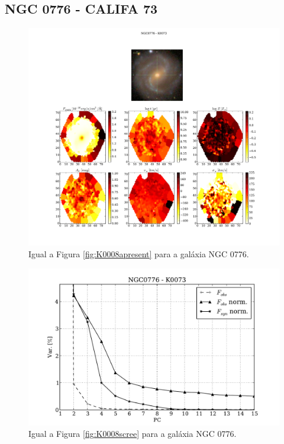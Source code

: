 \subsection{NGC 0776 - CALIFA 73}

\begin{figure}
    \includegraphics[width=1.\textwidth]{figuras/K0073-apresent.pdf}
    \caption[Propriedades f\'isicas da gal\'axia NGC 0776.]
    {Igual a Figura \ref{fig:K0008apresent} para a galáxia NGC 0776.}
    \label{fig:K0073apresent}
\end{figure}

\begin{figure}
    \includegraphics[height=0.33\textheight]{figuras/K0073-screetest.pdf}
    \caption[Scree test comparativo entre 3 PCAs - NGC 0776.]
    {Igual a Figura \ref{fig:K0008scree} para a galáxia NGC 0776.}
    \label{fig:K0073scree}
\end{figure}

